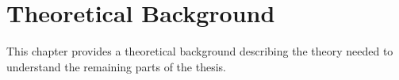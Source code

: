 \documentclass{kththesis}
\begin{document}
\chapter{Theoretical Background}\label{chap:background}
This chapter provides a theoretical background describing the theory needed to understand the remaining parts of the thesis.

\end{document}
